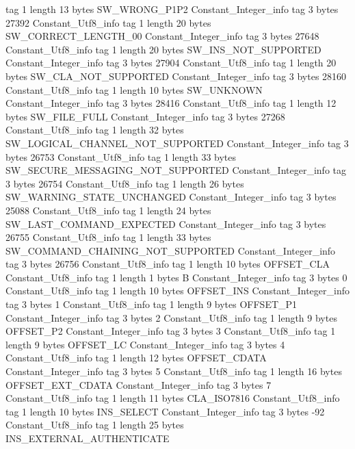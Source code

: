 {{{			tag	1
			length	13
			bytes	SW_WRONG_P1P2
		}
		Constant_Integer_info {
			tag	3
			bytes	27392
		}
		Constant_Utf8_info {
			tag	1
			length	20
			bytes	SW_CORRECT_LENGTH_00
		}
		Constant_Integer_info {
			tag	3
			bytes	27648
		}
		Constant_Utf8_info {
			tag	1
			length	20
			bytes	SW_INS_NOT_SUPPORTED
		}
		Constant_Integer_info {
			tag	3
			bytes	27904
		}
		Constant_Utf8_info {
			tag	1
			length	20
			bytes	SW_CLA_NOT_SUPPORTED
		}
		Constant_Integer_info {
			tag	3
			bytes	28160
		}
		Constant_Utf8_info {
			tag	1
			length	10
			bytes	SW_UNKNOWN
		}
		Constant_Integer_info {
			tag	3
			bytes	28416
		}
		Constant_Utf8_info {
			tag	1
			length	12
			bytes	SW_FILE_FULL
		}
		Constant_Integer_info {
			tag	3
			bytes	27268
		}
		Constant_Utf8_info {
			tag	1
			length	32
			bytes	SW_LOGICAL_CHANNEL_NOT_SUPPORTED
		}
		Constant_Integer_info {
			tag	3
			bytes	26753
		}
		Constant_Utf8_info {
			tag	1
			length	33
			bytes	SW_SECURE_MESSAGING_NOT_SUPPORTED
		}
		Constant_Integer_info {
			tag	3
			bytes	26754
		}
		Constant_Utf8_info {
			tag	1
			length	26
			bytes	SW_WARNING_STATE_UNCHANGED
		}
		Constant_Integer_info {
			tag	3
			bytes	25088
		}
		Constant_Utf8_info {
			tag	1
			length	24
			bytes	SW_LAST_COMMAND_EXPECTED
		}
		Constant_Integer_info {
			tag	3
			bytes	26755
		}
		Constant_Utf8_info {
			tag	1
			length	33
			bytes	SW_COMMAND_CHAINING_NOT_SUPPORTED
		}
		Constant_Integer_info {
			tag	3
			bytes	26756
		}
		Constant_Utf8_info {
			tag	1
			length	10
			bytes	OFFSET_CLA
		}
		Constant_Utf8_info {
			tag	1
			length	1
			bytes	B
		}
		Constant_Integer_info {
			tag	3
			bytes	0
		}
		Constant_Utf8_info {
			tag	1
			length	10
			bytes	OFFSET_INS
		}
		Constant_Integer_info {
			tag	3
			bytes	1
		}
		Constant_Utf8_info {
			tag	1
			length	9
			bytes	OFFSET_P1
		}
		Constant_Integer_info {
			tag	3
			bytes	2
		}
		Constant_Utf8_info {
			tag	1
			length	9
			bytes	OFFSET_P2
		}
		Constant_Integer_info {
			tag	3
			bytes	3
		}
		Constant_Utf8_info {
			tag	1
			length	9
			bytes	OFFSET_LC
		}
		Constant_Integer_info {
			tag	3
			bytes	4
		}
		Constant_Utf8_info {
			tag	1
			length	12
			bytes	OFFSET_CDATA
		}
		Constant_Integer_info {
			tag	3
			bytes	5
		}
		Constant_Utf8_info {
			tag	1
			length	16
			bytes	OFFSET_EXT_CDATA
		}
		Constant_Integer_info {
			tag	3
			bytes	7
		}
		Constant_Utf8_info {
			tag	1
			length	11
			bytes	CLA_ISO7816
		}
		Constant_Utf8_info {
			tag	1
			length	10
			bytes	INS_SELECT
		}
		Constant_Integer_info {
			tag	3
			bytes	-92
		}
		Constant_Utf8_info {
			tag	1
			length	25
			bytes	INS_EXTERNAL_AUTHENTICATE
}}}
